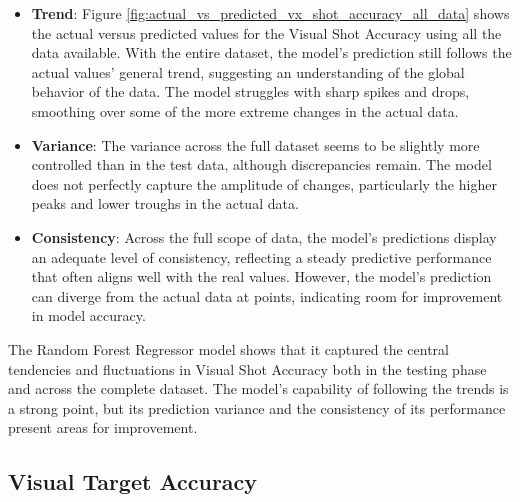\begin{itemize}
    \item \textbf{Trend}: Figure \ref{fig:actual_vs_predicted_vx_shot_accuracy_all_data} shows the actual versus predicted values for the Visual Shot Accuracy using all the data available.
          With the entire dataset, the model's prediction still follows the actual values' general trend, suggesting an understanding of the global behavior of the data. The model struggles
          with sharp spikes and drops, smoothing over some of the more extreme changes in the actual data.

    \item \textbf{Variance}: The variance across the full dataset seems to be slightly more controlled than in the test data, although discrepancies remain. The model does not perfectly capture
          the amplitude of changes, particularly the higher peaks and lower troughs in the actual data.

    \item \textbf{Consistency}: Across the full scope of data, the model's predictions display an adequate level of consistency, reflecting a steady predictive performance that often aligns well with the real values.
          However, the model's prediction can diverge from the actual data at points, indicating room for improvement in model accuracy.

\end{itemize}

The Random Forest Regressor model shows that it captured the central tendencies and fluctuations in Visual Shot Accuracy both in the testing phase and across the complete dataset. The model's capability of
following the trends is a strong point, but its prediction variance and the consistency of its performance present areas for improvement.


\subsection*{Visual Target Accuracy}

